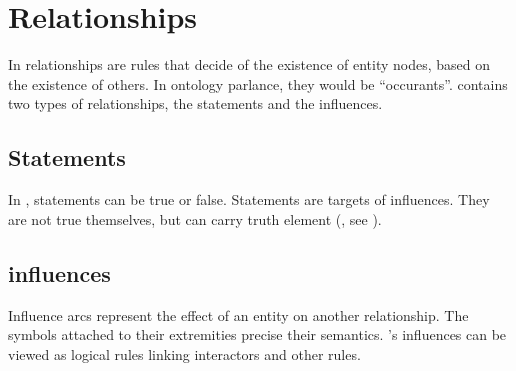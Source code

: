 
\section{Relationships}\label{sec:relationships}

In \SBGNERLone{} relationships are rules that decide of the existence of entity nodes, based on the existence of others. In ontology parlance, they would be ``occurants''. \SBGNERLone{} contains two types of relationships, the statements and the influences.


\subsection{Statements}\label{sec:statements}

In \SBGNERLone{}, statements can be true or false. Statements are targets of influences. They are not true themselves, but can carry truth element (, see ). 





\subsection{influences}\label{sec:influences}

Influence arcs represent the effect of an entity on another relationship. The symbols attached to their extremities precise their semantics. \SBGNERLone's influences can be viewed as logical rules linking interactors and other rules.







